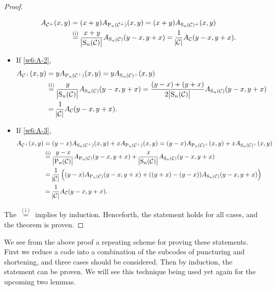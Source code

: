 \begin{proof}
\begin{itemize}
        \begin{align*}
            A_{\mathcal{C}^\perp}(x,y) &= (x+y) A_{\mathrm{P}_n(\mathcal{C}^\perp)}(x,y) = (x+y) A_{\mathrm{S}_n(\mathcal{C})^\perp}(x,y) \\
            &\stackrel{(\text{i})}{=} \frac{x+y}{\abs{\mathrm{S}_n(\mathcal{C})}}A_{\mathrm{S}_n(\mathcal{C})}(y-x,y+x) = \frac{1}{\abs{\mathcal{C}}} A_{\mathcal{C}}(y-x,y+x).
        \end{align*}
        \item If \ref{w6:A-2},
        \begin{align*}
            A_{\mathcal{C}^\perp}(x,y) &= y A_{\mathrm{P}_n(\mathcal{C}^\perp)}(x,y) = y A_{\mathrm{S}_n(\mathcal{C})^\perp}(x,y) \\
            &\stackrel{(\text{i})}{=} \frac{y}{\abs{\mathrm{S}_n(\mathcal{C})}} A_{\mathrm{S}_n(\mathcal{C})}(y-x,y+x) = \frac{(y-x)+(y+x)}{2\abs{\mathrm{S}_n(\mathcal{C})}} A_{\mathrm{S}_n(\mathcal{C})}(y-x,y+x) \\
            &= \frac{1}{\abs{\mathcal{C}}} A_{\mathcal{C}}(y-x,y+x).
        \end{align*}
        \item If \ref{w6:A-3},
        \begin{align*}
            A_{\mathcal{C}^\perp}(x,y) &= (y-x) A_{\mathrm{S}_n(\mathcal{C}^\perp)}(x,y) + x A_{\mathrm{P}_n(\mathcal{C}^\perp)}(x,y) = (y-x) A_{\mathrm{P}_n(\mathcal{C})^\perp}(x,y) + x A_{\mathrm{S}_n(\mathcal{C})^\perp}(x,y) \\
            &\stackrel{(\text{i})}{=} \frac{y-x}{\abs{\mathrm{P}_n(\mathcal{C})}} A_{\mathrm{P}_n(\mathcal{C})}(y-x,y+x) + \frac{x}{\abs{\mathrm{S}_n(\mathcal{C})}} A_{\mathrm{S}_n(\mathcal{C})}(y-x,y+x) \\
            &= \frac{1}{\abs{\mathcal{C}}} \left((y-x)A_{\mathrm{P}_n(\mathcal{C})}(y-x,y+x) + ((y+x)-(y-x))A_{\mathrm{S}_n(\mathcal{C})}(y-x,y+x)\right) \\
            &= \frac{1}{\abs{\mathcal{C}}} A_\mathcal{C}(y-x,y+x).
        \end{align*}
    \end{itemize}
    The $\stackrel{(\text{i})}{=}$ implies by induction. Henceforth, the statement holds for all cases, and the theorem is proven.
\end{proof}

We see from the above proof a repeating scheme for proving these statements. First we reduce a code into a combination of the subcodes of puncturing and shortening, and three cases should be considered. Then by induction, the statement can be proven. We will see this technique being used yet again for the upcoming two lemmas.



